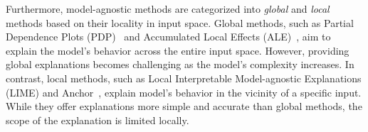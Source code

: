 \documentclass[11pt]{article}
\begin{document}
Furthermore, model-agnostic methods are categorized into
\emph{global} and \emph{local} methods based on their locality in input space.
Global methods,
such as Partial Dependence Plots (PDP)~\cite{friedman2001greedy}
and Accumulated Local Effects (ALE)~\cite{apley2020visualizing},
aim to explain the model's behavior across the entire input space.
However, providing global explanations becomes challenging
as the model's complexity increases.
In contrast, local methods,
such as Local Interpretable Model-agnostic Explanations (LIME)
\cite{ribeiro2016why}
and Anchor~\cite{ribeiro2018anchors},
explain model's behavior in the vicinity of a specific input.
While they offer explanations more simple and accurate
than global methods,
the scope of the explanation is limited locally.
\end{document}
